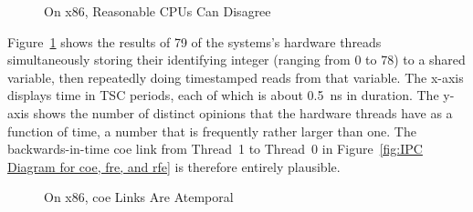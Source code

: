 \documentclass[10]{article}
\begin{document}
\begin{figure}[tb]
\begin{center}
\caption{On x86, Reasonable CPUs Can Disagree}
\label{fig:On x86; Reasonable CPUs Can Disagree}
\end{center}
\end{figure}

Figure~\ref{fig:On x86; Reasonable CPUs Can Disagree}
shows the results of 79 of the systems's hardware threads simultaneously
storing their identifying integer (ranging from 0 to 78) to a shared
variable, then repeatedly doing timestamped reads from that variable.
The x-axis displays time in TSC periods, each of which is about 0.5~ns
in duration.
The y-axis shows the number of distinct opinions that the hardware
threads have as a function of time, a number that is frequently rather
larger than one.
The backwards-in-time coe link from Thread~1 to Thread~0 in
Figure~\ref{fig:IPC Diagram for coe, fre, and rfe}
is therefore entirely plausible.

\begin{figure}[tb]
\begin{center}
\caption{On x86, coe Links Are Atemporal}
\label{fig:On x86; coe Links Are Atemporal}
\end{center}
\end{figure}
\end{document}
